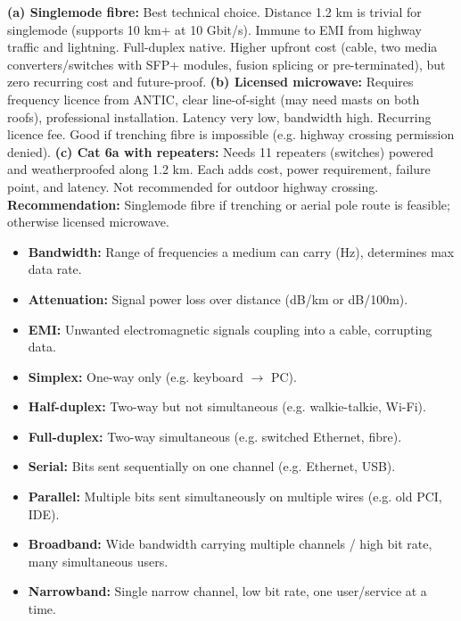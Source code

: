 \documentclass[11pt]{article}
\begin{document}
\begin{corrige}[Exercise 1]
\textbf{(a) Singlemode fibre:} Best technical choice. Distance 1.2 km is trivial for singlemode (supports 10 km+ at 10 Gbit/s). Immune to EMI from highway traffic and lightning. Full-duplex native. Higher upfront cost (cable, two media converters/switches with SFP+ modules, fusion splicing or pre-terminated), but zero recurring cost and future-proof.
\textbf{(b) Licensed microwave:} Requires frequency licence from ANTIC, clear line-of-sight (may need masts on both roofs), professional installation. Latency very low, bandwidth high. Recurring licence fee. Good if trenching fibre is impossible (e.g. highway crossing permission denied).
\textbf{(c) Cat 6a with repeaters:} Needs 11 repeaters (switches) powered and weatherproofed along 1.2 km. Each adds cost, power requirement, failure point, and latency. Not recommended for outdoor highway crossing.
\textbf{Recommendation:} Singlemode fibre if trenching or aerial pole route is feasible; otherwise licensed microwave.
\end{corrige}

\begin{corrige}[Exercise 2]
\begin{itemize}
\item \textbf{Bandwidth:} Range of frequencies a medium can carry (Hz), determines max data rate.
\item \textbf{Attenuation:} Signal power loss over distance (dB/km or dB/100m).
\item \textbf{EMI:} Unwanted electromagnetic signals coupling into a cable, corrupting data.
\item \textbf{Simplex:} One-way only (e.g. keyboard $\rightarrow$ PC).
\item \textbf{Half-duplex:} Two-way but not simultaneous (e.g. walkie-talkie, Wi-Fi).
\item \textbf{Full-duplex:} Two-way simultaneous (e.g. switched Ethernet, fibre).
\item \textbf{Serial:} Bits sent sequentially on one channel (e.g. Ethernet, USB).
\item \textbf{Parallel:} Multiple bits sent simultaneously on multiple wires (e.g. old PCI, IDE).
\item \textbf{Broadband:} Wide bandwidth carrying multiple channels / high bit rate, many simultaneous users.
\item \textbf{Narrowband:} Single narrow channel, low bit rate, one user/service at a time.
\end{itemize}
\end{corrige}
\end{document}
